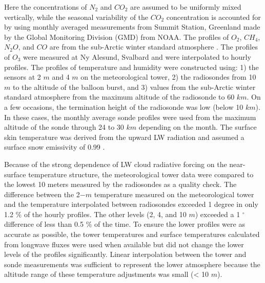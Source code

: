 Here the concentrations of $N_{2}$ and $CO_{2}$ are assumed to be uniformly mixed vertically, while the seasonal variability of the $CO_{2}$ concentration is accounted for by using monthly averaged measurements from Summit Station, Greenland made by the Global Monitoring Division (GMD) from NOAA. The profiles of $O_{2}$, $CH_{4}$, $N_{2}O$, and $CO$ are from the sub-Arctic winter standard atmosphere \citep{mcclatchey:1972}. The profiles of $O_{3}$ were measured at Ny Alesund, Svalbard and were interpolated to hourly profiles. The profiles of temperature and humidity were constructed using: 1) the sensors at 2 $m$ and 4 $m$ on the meteorological tower, 2) the radiosondes from 10 $m$ to the altitude of the balloon burst, and 3) values from the sub-Arctic winter standard atmosphere from the maximum altitude of the radiosonde to 60 $km$. On a few occasions, the termination height of the radiosonde was low (below 10 $km$). In these cases, the monthly average sonde profiles were used from the maximum altitude of the sonde through 24 to 30 $km$ depending on the month. The surface skin temperature was derived from the upward LW radiation \citep{walden:2017} and assumed a surface snow emissivity of 0.99 \citep{persson:2002, grenfell:1999}.

Because of the strong dependence of LW cloud radiative forcing on the near-surface temperature structure, the meteorological tower data were compared to the lowest 10 meters measured by the radiosondes as a quality check. The difference between the 2$-m$ temperature measured on the meteorological tower and the temperature interpolated between radiosondes exceeded 1 degree in only 1.2 $\%$ of the hourly profiles. The other levels (2, 4, and 10 $m$) exceeded a 1 $^{\circ}$ difference of less than 0.5 $\%$ of the time. To ensure the lower profiles were as accurate as possible, the tower temperatures and surface temperatures calculated from longwave fluxes were used when available but did not change the lower levels of the profiles significantly. Linear interpolation between the tower and sonde measurements was sufficient to represent the lower atmosphere because the altitude range of these temperature adjustments was small (< 10 $m$).

